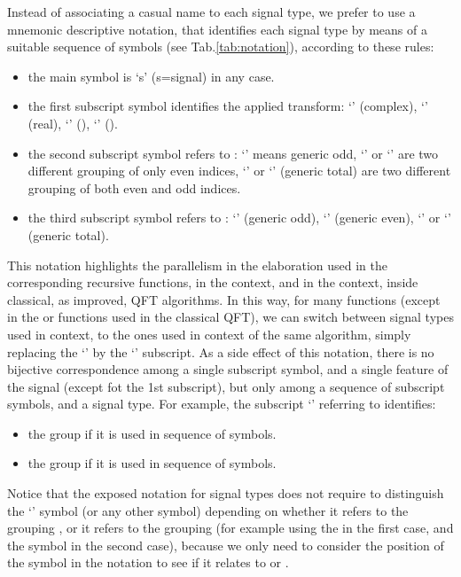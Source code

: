 \documentclass[a4paper,10pt]{article}
\begin{document}
Instead of associating a casual name to each signal type, we prefer to use a mnemonic descriptive notation, that identifies each signal type by means of a suitable sequence of symbols (see Tab.\ref{tab:notation}), according to these rules:
\begin{itemize}

\item
the main symbol is `s' (s=signal) in any case.

\item
the first subscript symbol identifies the applied transform: `'  (complex), `' (real), `' (), `' ().

\item
the second subscript symbol refers to : `' means generic odd, `' or `' are two different grouping of only even  indices,  `' or `' (generic total) are two different grouping of both even and odd  indices.


\item
the third subscript symbol refers to : `' (generic odd), `' (generic even), `' or `' (generic total).


\end{itemize}
This notation highlights the parallelism in the elaboration used in the corresponding recursive functions, in the   context, and in the  context, inside classical, as improved, QFT algorithms. 
In this way, for many functions (except in the  or  functions used in the classical QFT), we can switch between signal types used in  context, to the ones used in  context of the same algorithm, simply replacing the `' by the `' subscript.
As a side effect of this notation, there is no bijective correspondence among a single subscript symbol, and a single feature of the signal (except fot the 1st subscript), but only among a sequence of subscript symbols, and a signal type.
For example, the subscript `' referring to  identifies:
\begin{itemize}

\item
the group  if it is used in  sequence of symbols.

\item
the group  if it is used in  sequence of symbols.

\end{itemize}
Notice that the exposed notation for signal types does not require to distinguish the `' symbol (or any other symbol) depending on whether it refers to the grouping , or it refers to the grouping   (for example using the  in the first case, and the symbol  in the second case), because we only need to consider the position of the symbol in the notation to see if it relates to  or . 
\end{document}
